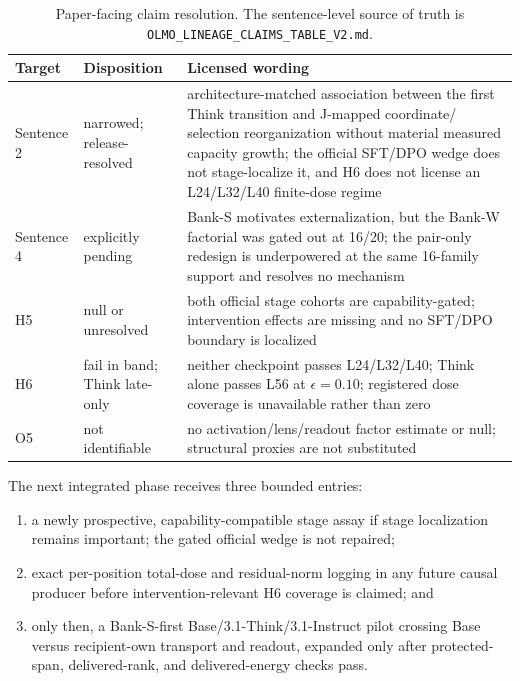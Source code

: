 \documentclass[11pt]{article}
\begin{document}
\begin{table}[H]
\centering\small
\begin{tabularx}{\textwidth}{@{}
  >{\raggedright\arraybackslash}p{}
  >{\raggedright\arraybackslash}p{}
  >{\raggedright\arraybackslash}X@{}}
\toprule
\textbf{Target} & \textbf{Disposition} & \textbf{Licensed wording}\\
\midrule
Sentence 2 & narrowed; release-resolved & architecture-matched
association between the first Think transition and J-mapped coordinate/
selection reorganization without material measured capacity growth; the
official SFT/DPO wedge does not stage-localize it, and H6 does not license an
L24/L32/L40 finite-dose regime\\
Sentence 4 & explicitly pending & Bank-S motivates externalization, but the
Bank-W factorial was gated out at 16/20; the pair-only redesign is underpowered
at the same 16-family support and resolves no mechanism\\
H5 & null or unresolved & both official stage cohorts are capability-gated;
intervention effects are missing and no SFT/DPO boundary is localized\\
H6 & fail in band; Think late-only & neither checkpoint passes L24/L32/L40;
Think alone passes L56 at $\epsilon=0.10$; registered dose coverage is
unavailable rather than zero\\
O5 & not identifiable & no activation/lens/readout factor estimate or null;
structural proxies are not substituted\\
\bottomrule
\end{tabularx}
\caption{Paper-facing claim resolution. The sentence-level source of truth is
\nolinkurl{OLMO_LINEAGE_CLAIMS_TABLE_V2.md}.}
\end{table}

The next integrated phase receives three bounded entries:

\begin{enumerate}
  \item a newly prospective, capability-compatible stage assay if stage
    localization remains important; the gated official wedge is not repaired;
  \item exact per-position total-dose and residual-norm logging in any future
    causal producer before intervention-relevant H6 coverage is claimed; and
  \item only then, a Bank-S-first Base/3.1-Think/3.1-Instruct pilot crossing Base versus
    recipient-own transport and readout, expanded only after protected-span,
    delivered-rank, and delivered-energy checks pass.
\end{enumerate}
\end{document}
